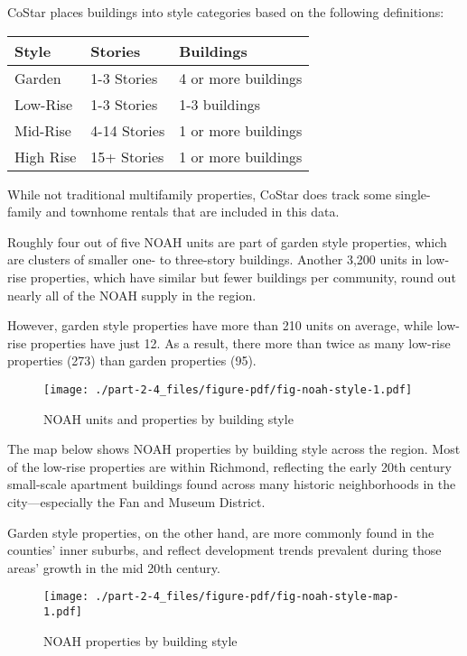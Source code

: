 \documentclass[
  letterpaper,
  DIV=11,
  numbers=noendperiod]{scrreprt}
\begin{document}
CoStar places buildings into style categories based on the following
definitions:

\begin{longtable}[]{@{}lll@{}}
\toprule()
Style & Stories & Buildings \\
\midrule()
\endhead
Garden & 1-3 Stories & 4 or more buildings \\
Low-Rise & 1-3 Stories & 1-3 buildings \\
Mid-Rise & 4-14 Stories & 1 or more buildings \\
High Rise & 15+ Stories & 1 or more buildings \\
\bottomrule()
\end{longtable}

While not traditional multifamily properties, CoStar does track some
single-family and townhome rentals that are included in this data.

Roughly four out of five NOAH units are part of garden style properties,
which are clusters of smaller one- to three-story buildings. Another
3,200 units in low-rise properties, which have similar but fewer
buildings per community, round out nearly all of the NOAH supply in the
region.

However, garden style properties have more than 210 units on average,
while low-rise properties have just 12. As a result, there more than
twice as many low-rise properties (273) than garden properties (95).

\begin{figure}

{\centering \texttt{[image: ./part-2-4\_files/figure-pdf/fig-noah-style-1.pdf]}

}

\caption{\label{fig-noah-style}NOAH units and properties by building
style}

\end{figure}

The map below shows NOAH properties by building style across the region.
Most of the low-rise properties are within Richmond, reflecting the
early 20th century small-scale apartment buildings found across many
historic neighborhoods in the city---especially the Fan and Museum
District.

Garden style properties, on the other hand, are more commonly found in
the counties' inner suburbs, and reflect development trends prevalent
during those areas' growth in the mid 20th century.

\begin{figure}

{\centering \texttt{[image: ./part-2-4\_files/figure-pdf/fig-noah-style-map-1.pdf]}

}

\caption{\label{fig-noah-style-map}NOAH properties by building style}

\end{figure}
\end{document}
